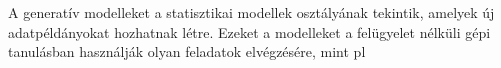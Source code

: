 A generatív modelleket a statisztikai modellek osztályának tekintik, amelyek új adatpéldányokat hozhatnak létre. Ezeket a modelleket a felügyelet nélküli gépi tanulásban használják olyan feladatok elvégzésére, mint pl









